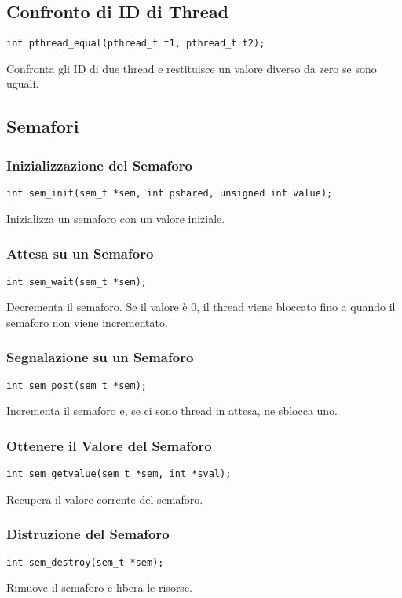 \documentclass[a4paper,12pt]{article}
\begin{document}
\subsection{Confronto di ID di Thread}
\begin{verbatim}
int pthread_equal(pthread_t t1, pthread_t t2);
\end{verbatim}
Confronta gli ID di due thread e restituisce un valore diverso da zero se sono uguali.

\subsection{Semafori}

\subsubsection{Inizializzazione del Semaforo}
\begin{verbatim}
int sem_init(sem_t *sem, int pshared, unsigned int value);
\end{verbatim}
Inizializza un semaforo con un valore iniziale.

\subsubsection{Attesa su un Semaforo}
\begin{verbatim}
int sem_wait(sem_t *sem);
\end{verbatim}
Decrementa il semaforo. Se il valore è 0, il thread viene bloccato fino a quando il semaforo non viene incrementato.

\subsubsection{Segnalazione su un Semaforo}
\begin{verbatim}
int sem_post(sem_t *sem);
\end{verbatim}
Incrementa il semaforo e, se ci sono thread in attesa, ne sblocca uno.

\subsubsection{Ottenere il Valore del Semaforo}
\begin{verbatim}
int sem_getvalue(sem_t *sem, int *sval);
\end{verbatim}
Recupera il valore corrente del semaforo.

\subsubsection{Distruzione del Semaforo}
\begin{verbatim}
int sem_destroy(sem_t *sem);
\end{verbatim}
Rimuove il semaforo e libera le risorse.
\end{document}
